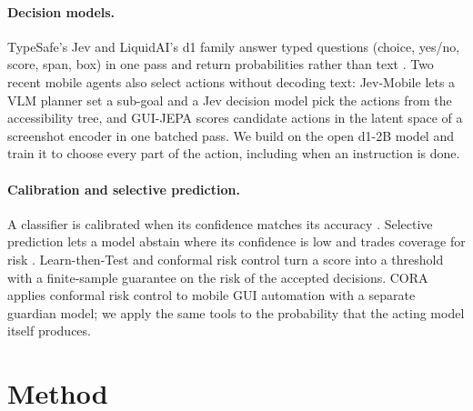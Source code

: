 \documentclass{article}
\begin{document}
\paragraph{Decision models.}
TypeSafe's Jev and LiquidAI's d1 family answer typed questions (choice, yes/no, score, span, box) in one pass and
return probabilities rather than text \citep{typesafe2026,liquidd12026}. Two recent mobile agents also select
actions without decoding text: Jev-Mobile \citep{jevmobile2026} lets a VLM planner set a sub-goal and a Jev decision
model pick the actions from the accessibility tree, and GUI-JEPA \citep{guijepa2026} scores candidate actions in the
latent space of a screenshot encoder in one batched pass. We build on the open d1-2B model and train it to choose
every part of the action, including when an instruction is done.

\paragraph{Calibration and selective prediction.}
A classifier is calibrated when its confidence matches its accuracy \citep{guo2017calibration}. Selective
prediction lets a model abstain where its confidence is low and trades coverage for risk
\citep{geifman2017selective}. Learn-then-Test \citep{angelopoulos2021ltt} and conformal risk control
\citep{angelopoulos2024crc} turn a score into a threshold with a finite-sample guarantee on the risk of the
accepted decisions. CORA \citep{cora2026} applies conformal risk control to mobile GUI automation with a separate
guardian model; we apply the same tools to the probability that the acting model itself produces.

\section{Method}
\label{sec:method}
\end{document}
